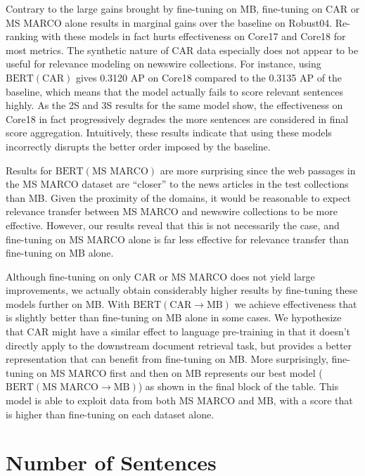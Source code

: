 Contrary to the large gains brought by fine-tuning on MB, fine-tuning on CAR or MS MARCO alone results in marginal gains over the baseline on Robust04.
Re-ranking with these models in fact hurts effectiveness on Core17 and Core18 for most metrics.
The synthetic nature of CAR data especially does not appear to be useful for relevance modeling on newswire collections.
For instance, using $ \textrm{BERT}(\textrm{CAR}) $ gives 0.3120 AP on Core18 compared to the 0.3135 AP of the baseline, which means that the model actually fails to score relevant sentences highly.
As the 2S and 3S results for the same model show, the effectiveness on Core18 in fact progressively degrades the more sentences are considered in final score aggregation.
Intuitively, these results indicate that using these models incorrectly disrupts the better order imposed by the baseline.

Results for $ \textrm{BERT}(\textrm{MS MARCO}) $ are more surprising since the web passages in the MS MARCO dataset are ``closer'' to the news articles in the test collections than MB.
Given the proximity of the domains, it would be reasonable to expect relevance transfer between MS MARCO and newswire collections to be more effective.
However, our results reveal that this is not necessarily the case, and fine-tuning on MS MARCO alone is far less effective for relevance transfer than fine-tuning on MB alone.

Although fine-tuning on only CAR or MS MARCO does not yield large improvements, we actually obtain considerably higher results by fine-tuning these models further on MB.
With $ \textrm{BERT}(\textrm{CAR}\rightarrow\textrm{MB}) $ we achieve effectiveness that is slightly better than fine-tuning on MB alone in some cases.
We hypothesize that CAR might have a similar effect to language pre-training in that it doesn't directly apply to the downstream document retrieval task, but provides a better representation that can benefit from fine-tuning on MB.
More surprisingly, fine-tuning on MS MARCO first and then on MB represents our best model ($ \textrm{BERT}(\textrm{MS MARCO}\rightarrow\textrm{MB}) $) as shown in the final block of the table.
This model is able to exploit data from both MS MARCO and MB, with a score that is higher than fine-tuning on each dataset alone.

\section{Number of Sentences}

